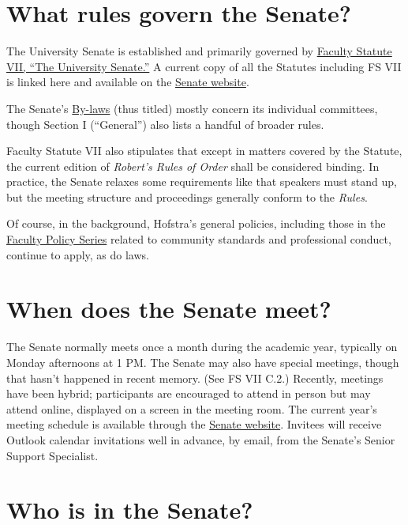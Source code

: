\documentclass[12pt]{article}
\begin{document}
\section{What rules govern the
Senate?}\label{what-rules-govern-the-senate}

The University Senate is established and primarily governed by
\href{https://www.hofstra.edu/sites/default/files/2024-04/facultystatutes.pdf}{Faculty
Statute VII, ``The University Senate.''} A current copy of all the
Statutes including FS VII is linked here and available on the
\href{https://www.hofstra.edu/senate/}{Senate website}.

The Senate's
\href{https://www.hofstra.edu/sites/default/files/2022-04/senatebylaws.pdf}{By-laws}
(thus titled) mostly concern its individual committees, though Section I
(``General'') also lists a handful of broader rules.

Faculty Statute VII also stipulates that except in matters covered by
the Statute, the current edition of \emph{Robert's Rules of Order} shall
be considered binding. In practice, the Senate relaxes some requirements
like that speakers must stand up, but the meeting structure and
proceedings generally conform to the \emph{Rules}.

Of course, in the background, Hofstra's general policies, including
those in the
\href{https://www.hofstra.edu/senate/faculty-policy-series.html}{Faculty
Policy Series} related to community standards and professional conduct,
continue to apply, as do laws.

\section{When does the Senate meet?}\label{when-does-the-senate-meet}

The Senate normally meets once a month during the academic year,
typically on Monday afternoons at 1 PM. The Senate may also have special
meetings, though that hasn't happened in recent memory. (See FS VII
C.2.) Recently, meetings have been hybrid; participants are encouraged
to attend in person but may attend online, displayed on a screen in the
meeting room. The current year's meeting schedule is available through
the \href{https://www.hofstra.edu/senate/}{Senate website}. Invitees
will receive Outlook calendar invitations well in advance, by email,
from the Senate's Senior Support Specialist.

\section{Who is in the Senate?}\label{who-is-in-the-senate}
\end{document}
